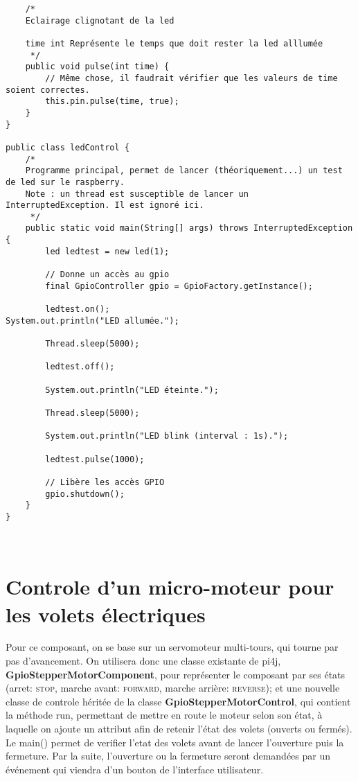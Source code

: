 \documentclass{article}
\newenvironment{DDbox}[1]{
\begin{lrbox}{\BBbox}\begin{minipage}{\linewidth}}
{\end{minipage}\end{lrbox}\noindent\colorbox{Zgris}{\usebox{\BBbox}} \\
[.5cm]}
\begin{document}
\begin{DDbox}{\linewidth}
\begin{lstlisting}
    /*
    Eclairage clignotant de la led

    time int Représente le temps que doit rester la led alllumée
     */
    public void pulse(int time) {
        // Même chose, il faudrait vérifier que les valeurs de time soient correctes.
        this.pin.pulse(time, true);
    }
}

public class ledControl {
    /*
    Programme principal, permet de lancer (théoriquement...) un test de led sur le raspberry.
    Note : un thread est susceptible de lancer un InterruptedException. Il est ignoré ici.
     */
    public static void main(String[] args) throws InterruptedException {
        led ledtest = new led(1);

        // Donne un accès au gpio
        final GpioController gpio = GpioFactory.getInstance();

        ledtest.on();
System.out.println("LED allumée.");

        Thread.sleep(5000);

        ledtest.off();

        System.out.println("LED éteinte.");

        Thread.sleep(5000);

        System.out.println("LED blink (interval : 1s).");

        ledtest.pulse(1000);

        // Libère les accès GPIO
        gpio.shutdown();
    }
}
\end{lstlisting}
\end{DDbox}
\clearpage
\vfill
\section*{Controle d'un micro-moteur pour les volets électriques}

Pour ce composant, on se base sur un servomoteur multi-tours, qui tourne par pas d'avancement.
\linebreak
\linebreak
On utilisera donc une classe existante de pi4j, \textbf{GpioStepperMotorComponent}, pour représenter le composant par ses états (arret: \textsc{stop}, marche avant: \textsc{forward}, marche arrière: \textsc{reverse}); et une nouvelle classe de controle héritée de la classe \textbf{GpioStepperMotorControl}, qui contient la méthode run, permettant de mettre en route le moteur selon son état, à laquelle on ajoute un attribut afin de retenir l'état des volets (ouverts ou fermés).
\linebreak
\linebreak
Le main() permet de verifier l'etat des volets avant de lancer l'ouverture puis la fermeture. Par la suite, l'ouverture ou la fermeture seront demandées par un événement qui viendra d'un bouton de l'interface utilisateur.
\vfill
\end{document}
